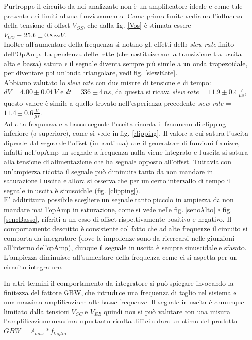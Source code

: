 \documentclass[10pt,a4paper]{article}
\begin{document}
Purtroppo il circuito da noi analizzato non è un amplificatore ideale e come tale presenta dei limiti al suo funzionamento. Come primo limite vediamo l'influenza della tensione di offset $V_{OS}$, che dalla fig. \ref{Vos} è stimata essere $V_{OS} = 25.6 \pm 0.8 \, mV$.\\

Inoltre all'aumentare della frequenza si notano gli effetti dello \emph{slew rate} finito dell'OpAmp. La pendenza delle rette (che costituiscono la transizione tra uscita alta e bassa) satura e il segnale diventa sempre più simile a un onda trapezoidale, per diventare poi un'onda triangolare, vedi fig. \ref{slewRate}.\\

Abbiamo valutato lo \emph{slew rate} con due misure di tensione e di tempo: $dV = 4.00 \pm 0.04 \, V$ e $dt = 336 \pm 4 \, ns$, da questa si ricava \emph{slew rate} = $11.9 \pm 0.4 \, \frac{V}{\mu s}$, questo valore è simile a quello trovato nell'esperienza precedente \emph{slew rate} = $11.4 \pm 0.6 \, \frac{V}{\mu s}$.\\

Ad alta frequenza e a basso segnale l'uscita ricorda il fenomeno di clipping inferiore (o superiore), come si vede in fig. \ref{clipping}. Il valore a cui satura l'uscita dipende dal segno dell'offset (in continua) che il generatore di funzioni fornisce, infatti nell'opAmp un segnale a frequenza nulla viene integrato e l'uscita si satura alla tensione di alimentazione che ha segnale opposto all'offset. Tuttavia con un'ampiezza ridotta il segnale può diminuire tanto da non mandare in saturazione l'uscita e allora si osserva che per un certo intervallo di tempo il segnale in uscita è sinusoidale (fig. \ref{clipping}).\\



E' addirittura possibile scegliere un segnale tanto piccolo in ampiezza da non mandare mai l'opAmp in saturazione, come si vede nelle fig. \ref{senoAlto} e fig. \ref{senoBasso}, riferiti a un caso di offset rispettivamente positivo e negativo.
Il comportamento descritto è consistente col fatto che ad alte frequenze il circuito si comporta da integratore (dove le impedenze sono da ricercarsi nelle giunzioni all'interno del'opAmp), dunque il segnale in uscita è sempre sinusoidale e sfasato. L'ampiezza diminuisce all'aumentare della frequenza come ci si aspetta per un circuito integratore. 



In altri termini il comportamento da integratore si può spiegare invocando la finitezza del fattore GBW, che intruduce una frequenza di taglio nel sistema e una massima amplificazione alle basse frequenze. Il segnale in uscita è comunque limitato dalla tensioni $V_{CC}$ e $V_{EE}$ quindi non si può valutare con una misura l'amplificazione massima e pertanto risulta difficile dare un stima del prodotto $GBW = A_{max} * f_{taglio}$.
\end{document}
